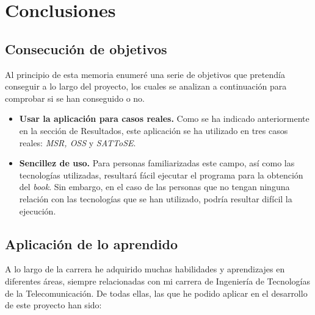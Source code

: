 \documentclass[a4paper, 12pt]{book}
\begin{document}
\cleardoublepage
\chapter{Conclusiones}
\label{chap:conclusiones}


\section{Consecución de objetivos}
\label{sec:consecucion-objetivos}
Al principio de esta memoria enumeré una serie de objetivos que pretendía conseguir a lo largo del proyecto, los cuales se analizan a continuación para comprobar si se han conseguido o no.

\begin{itemize}
  \item \textbf{Usar la aplicación para casos reales.} Como se ha indicado anteriormente en la sección de Resultados, este aplicación se ha utilizado en tres casos reales: \textit{MSR, OSS} y \textit{SATToSE}.
  \item \textbf{Sencillez de uso.} Para personas familiarizadas este campo, así como las tecnologías utilizadas, resultará fácil ejecutar el programa para la obtención del \textit{book}. Sin embargo, en el caso de las personas que no tengan ninguna relación con las tecnologías que se han utilizado, podría resultar difícil la ejecución.
\end{itemize}


\section{Aplicación de lo aprendido}
\label{sec:aplicacion}
A lo largo de la carrera he adquirido muchas habilidades y aprendizajes en diferentes áreas, siempre relacionadas con mi carrera de Ingeniería de Tecnologías de la Telecomunicación. De todas ellas, las que he podido aplicar en el desarrollo de este proyecto han sido:
\end{document}
